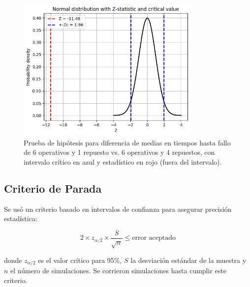 \documentclass{article}
\begin{document}
\begin{figure}[H]
   \centering
   \includegraphics[width=0.8\textwidth]{images/6_1_vs_6_4.png}
   \caption{Prueba de hipótesis para diferencia de medias en tiempos hasta fallo de 6 operativos y 1 repuesto vs. 6 operativos y 4 repuestos, con intervalo crítico en azul y estadístico en rojo (fuera del intervalo).}
\end{figure}


\subsection{Criterio de Parada}
Se usó un criterio basado en intervalos de confianza para asegurar precisión estadística:

\[
2 \times z_{\alpha/2} \times \frac{S}{\sqrt{n}} \leq \text{error aceptado}
\]

donde $z_{\alpha/2}$ es el valor crítico para 95\%, $S$ la desviación estándar de la muestra y $n$ el número de simulaciones. Se corrieron simulaciones hasta cumplir este criterio.
\end{document}
